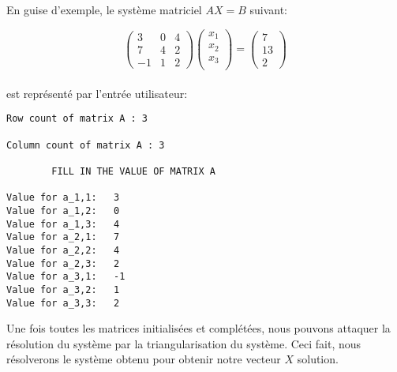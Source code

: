 En guise d'exemple, le système matriciel $AX=B$ suivant:

\begin{equation}
\begin{pmatrix}
3 & 0 & 4\\
7 & 4 & 2 \\
-1 & 1 & 2
\end{pmatrix} 
\begin{pmatrix}
x_1\\
x_2\\
x_3\\
\end{pmatrix}
=
\begin{pmatrix}
7 \\
13 \\
2
\end{pmatrix}
\end{equation}
\\


est représenté par l'entrée utilisateur:
\begin{lstlisting}[caption=User Input, basicstyle=\fontsize{6}{8}\selectfont]
Row count of matrix A : 3

Column count of matrix A : 3

		FILL IN THE VALUE OF MATRIX A 

Value for a_1,1:   3
Value for a_1,2:   0
Value for a_1,3:   4
Value for a_2,1:   7
Value for a_2,2:   4
Value for a_2,3:   2
Value for a_3,1:   -1
Value for a_3,2:   1
Value for a_3,3:   2

\end{lstlisting}
Une fois toutes les matrices initialisées et complétées, nous pouvons attaquer la résolution du système par la triangularisation du système. Ceci fait, nous résolverons le système obtenu pour obtenir notre vecteur $X$ solution.\\
